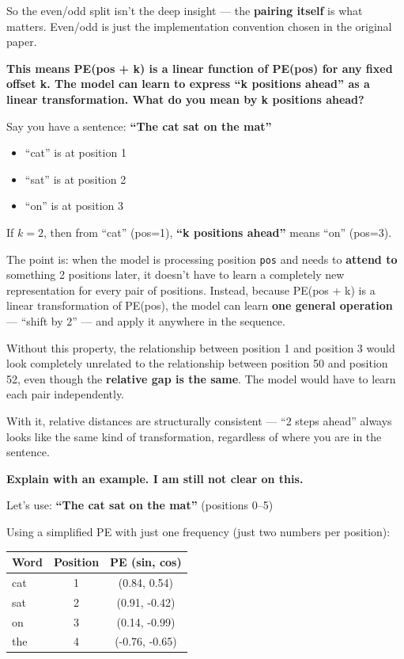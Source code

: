 So the even/odd split isn't the deep insight --- the \textbf{pairing itself} is what matters. Even/odd is just the implementation convention chosen in the original paper.

\bigskip

\textbf{This means PE(pos + k) is a linear function of PE(pos) for any fixed offset k. The model can learn to express ``k positions ahead'' as a linear transformation. What do you mean by k positions ahead?}

Say you have a sentence: \textbf{``The cat sat on the mat''}

\begin{itemize}
  \item ``cat'' is at position 1
  \item ``sat'' is at position 2
  \item ``on'' is at position 3
\end{itemize}

If $k = 2$, then from ``cat'' (pos=1), \textbf{``k positions ahead''} means ``on'' (pos=3).

The point is: when the model is processing position \texttt{pos} and needs to \textbf{attend to} something 2 positions later, it doesn't have to learn a completely new representation for every pair of positions. Instead, because PE(pos + k) is a linear transformation of PE(pos), the model can learn \textbf{one general operation} --- ``shift by 2'' --- and apply it anywhere in the sequence.

Without this property, the relationship between position 1 and position 3 would look completely unrelated to the relationship between position 50 and position 52, even though the \textbf{relative gap is the same}. The model would have to learn each pair independently.

With it, relative distances are structurally consistent --- ``2 steps ahead'' always looks like the same kind of transformation, regardless of where you are in the sentence.

\bigskip

\textbf{Explain with an example. I am still not clear on this.}

Let's use: \textbf{``The cat sat on the mat''} (positions 0--5)

Using a simplified PE with just one frequency (just two numbers per position):

\begin{center}
\begin{tabular}{|l|c|c|}
\hline
\textbf{Word} & \textbf{Position} & \textbf{PE (sin, cos)} \\
\hline
cat & 1 & (0.84, 0.54)   \\
sat & 2 & (0.91, -0.42)  \\
on  & 3 & (0.14, -0.99)  \\
the & 4 & (-0.76, -0.65) \\
\hline
\end{tabular}
\end{center}

